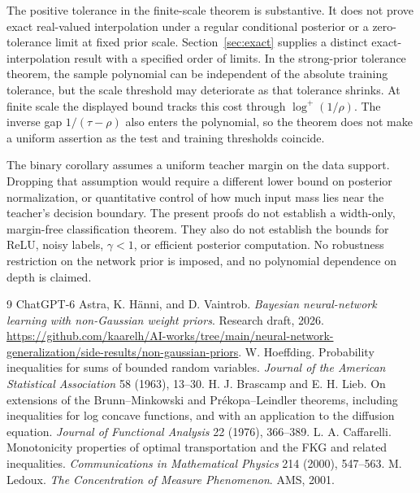\documentclass[11pt]{article}
\theoremstyle{remark}\newtheorem{remark}[theorem]{Remark}
\begin{document}
The positive tolerance in the finite-scale theorem is substantive. It does
not prove exact real-valued interpolation under a regular conditional
posterior or a zero-tolerance limit at fixed prior scale.
Section~\ref{sec:exact} supplies a distinct exact-interpolation result
with a specified order of limits. In the strong-prior tolerance theorem,
the sample polynomial can be independent of the absolute training tolerance,
but the scale threshold may deteriorate as that tolerance shrinks.
At finite scale the displayed bound tracks this cost through
$\log^+(1/\rho)$. The inverse gap $1/(\tau-\rho)$ also enters the
polynomial, so the theorem does not make a uniform assertion as the test
and training thresholds coincide.

The binary corollary assumes a uniform teacher margin on the data support.
Dropping that assumption would require a different lower bound on posterior
normalization, or quantitative control of how much input mass lies near the
teacher's decision boundary. The present proofs do not establish a
width-only, margin-free classification theorem. They also do not establish
the bounds for ReLU, noisy labels, $\gamma<1$, or efficient posterior
computation. No robustness restriction on the network prior is imposed,
and no polynomial dependence on depth is claimed.

\begingroup\small
\begin{thebibliography}{9}
 ChatGPT-6 Astra, K. H\"anni, and D. Vaintrob.
\emph{Bayesian neural-network learning with non-Gaussian weight priors}.
Research draft, 2026.
\url{https://github.com/kaarelh/AI-works/tree/main/neural-network-generalization/side-results/non-gaussian-priors}.
 W. Hoeffding.
Probability inequalities for sums of bounded random variables.
\emph{Journal of the American Statistical Association} 58 (1963), 13--30.
 H. J. Brascamp and E. H. Lieb.
On extensions of the Brunn--Minkowski and Pr\'ekopa--Leindler theorems,
including inequalities for log concave functions, and with an application
to the diffusion equation.
\emph{Journal of Functional Analysis} 22 (1976), 366--389.
 L. A. Caffarelli.
Monotonicity properties of optimal transportation and the FKG and related
inequalities. \emph{Communications in Mathematical Physics} 214 (2000), 547--563.
 M. Ledoux.
\emph{The Concentration of Measure Phenomenon}. AMS, 2001.
\end{thebibliography}\endgroup
\end{document}

